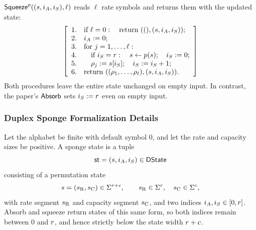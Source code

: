 \begin{construction}
\emph{\(\mathsf{Squeeze}^p((s,i_A,i_S),\ell)\)} reads \(\ell\) rate symbols and returns them with the updated state:
\begin{equation*}
\left[\begin{array}{rl}
  1.& \text{if }\ell=0:\quad\text{return }((),(s,i_A,i_S));\\
  2.& i_A:=0;\\
  3.& \text{for }j=1,\ldots,\ell:\\
  4.& \quad\text{if }i_S=r:\quad s\leftarrow p(s);\quad i_S:=0;\\
  5.& \quad\rho_j:=s[i_S];\quad i_S:=i_S+1;\\
  6.& \text{return }((\rho_1,\ldots,\rho_\ell),(s,i_A,i_S)).
\end{array}\right]
\end{equation*}
Both procedures leave the entire state unchanged on empty input. In contrast, the paper's \(\mathsf{Absorb}\) sets \(i_S:=r\) even on empty input.
\leanok
\end{construction}

\subsubsection{Duplex Sponge Formalization Details}
\label{sec:dsfs_duplex_formal_interface}

\begin{definition}
\label{def:dsfs_duplex_state}
\leanok
Let the alphabet be finite with default symbol \(0\), and let the rate and capacity sizes be positive. A sponge state is a tuple
\begin{equation*}
\mathsf{st}=(s,i_A,i_S)
\in\mathsf{DState}
\end{equation*}
consisting of a permutation state
\begin{equation*}
s=(s_{\mathrm R},s_{\mathrm C})
\in\Sigma^{r+c},
\qquad
s_{\mathrm R}\in\Sigma^{r},\quad
s_{\mathrm C}\in\Sigma^{c},
\end{equation*}
with rate segment \(s_{\mathrm R}\) and capacity segment \(s_{\mathrm C}\), and two indices \(i_A,i_S\in[0,r]\). Absorb and squeeze return states of this same form, so both indices remain between \(0\) and \(r\), and hence strictly below the state width \(r+c\).
\end{definition}
